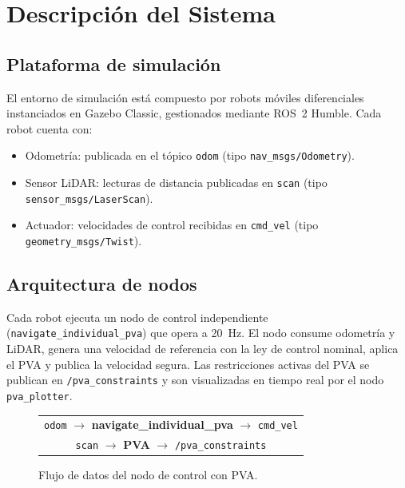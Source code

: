 \section{Descripción del Sistema}

\subsection{Plataforma de simulación}

El entorno de simulación está compuesto por robots móviles diferenciales instanciados en Gazebo Classic, gestionados mediante ROS~2 Humble. Cada robot cuenta con:

\begin{itemize}
  \item Odometría: publicada en el tópico \texttt{odom} (tipo \texttt{nav\_msgs/Odometry}).
  \item Sensor LiDAR: lecturas de distancia publicadas en \texttt{scan} (tipo \texttt{sensor\_msgs/LaserScan}).
  \item Actuador: velocidades de control recibidas en \texttt{cmd\_vel} (tipo \texttt{geometry\_msgs/Twist}).
\end{itemize}

\subsection{Arquitectura de nodos}

Cada robot ejecuta un nodo de control independiente (\texttt{navigate\_individual\_pva}) que opera a 20~Hz. El nodo consume odometría y LiDAR, genera una velocidad de referencia con la ley de control nominal, aplica el PVA y publica la velocidad segura. Las restricciones activas del PVA se publican en \texttt{/pva\_constraints} y son visualizadas en tiempo real por el nodo \texttt{pva\_plotter}.

\begin{figure}[h]
  \centering
  \begin{tabular}{c}
  \texttt{odom} $\rightarrow$ \textbf{navigate\_individual\_pva} $\rightarrow$ \texttt{cmd\_vel} \\[4pt]
  \texttt{scan} $\rightarrow$ \textbf{PVA} $\rightarrow$ \texttt{/pva\_constraints}
  \end{tabular}
  \caption{Flujo de datos del nodo de control con PVA.}
  \label{fig:arquitectura_nodos}
\end{figure}
